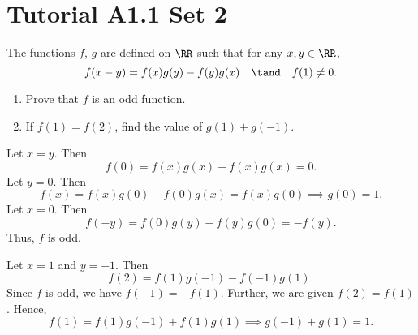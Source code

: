 \section{Tutorial A1.1 Set 2}

\begin{problem}
    The functions $f$, $g$ are defined on $\RR$ such that for any $x, y \in \RR$, \[f(x-y) = f(x)g(y) - f(y)g(x) \quad \tand \quad f(1) \neq 0.\]

    \begin{enumerate}
        \item Prove that $f$ is an odd function.
        \item If $f(1) = f(2)$, find the value of $g(1) + g(-1)$.
    \end{enumerate}
\end{problem}
\begin{solution}
    \begin{ppart}
        Let $x = y$. Then \[f(0) = f(x)g(x) - f(x)g(x) = 0.\] Let $y = 0$. Then \[f(x) = f(x)g(0) - f(0)g(x) = f(x)g(0) \implies g(0) = 1.\] Let $x = 0$. Then \[f(-y) = f(0)g(y) - f(y)g(0) = -f(y).\] Thus, $f$ is odd.
    \end{ppart}
    \begin{ppart}
        Let $x = 1$ and $y = -1$. Then \[f(2) = f(1)g(-1) - f(-1)g(1).\] Since $f$ is odd, we have $f(-1) = -f(1)$. Further, we are given $f(2) = f(1)$. Hence, \[f(1) = f(1)g(-1) + f(1)g(1) \implies g(-1) + g(1) = 1.\]
    \end{ppart}
\end{solution}

